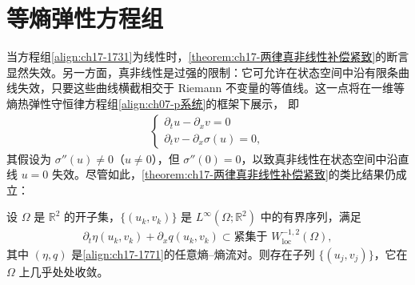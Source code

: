 \documentclass[../../main.tex]{subfiles}
\begin{document}
\section{等熵弹性方程组}\label{section:ch17-等熵弹性}

当方程组\eqref{align:ch17-1731}为线性时，\cref{theorem:ch17-两律真非线性补偿紧致}的断言显然失效。另一方面，真非线性是过强的限制：它可允许在状态空间中沿有限条曲线失效，只要这些曲线横截相交于 Riemann 不变量的等值线。这一点将在一维等熵热弹性守恒律方程组\eqref{align:ch07-p系统}的框架下展示，
即
\begin{align}
\begin{cases}
\partial_t u-\partial_x v=0\\
\partial_t v-\partial_x\sigma(u)=0,
\end{cases}
\label{align:ch17-1771}
\end{align}
其假设为 $\sigma''(u)\neq0$（$u\neq0$），但 $\sigma''(0)=0$，以致真非线性在状态空间中沿直线 $u=0$ 失效。尽管如此，\cref{theorem:ch17-两律真非线性补偿紧致}的类比结果仍成立：

\begin{theorem}[等熵弹性的补偿紧致性]\label{theorem:ch17-弹性补偿紧致}
设 $\Omega$ 是 $\mathbb{R}^2$ 的开子集，$\{(u_k,v_k)\}$ 是 $L^\infty(\Omega;\mathbb{R}^2)$ 中的有界序列，满足
\begin{align}
\partial_t\eta(u_k,v_k)+\partial_x q(u_k,v_k)\subset\text{紧集于 }W^{-1,2}_{\mathrm{loc}}(\Omega),
\label{align:ch17-1772}
\end{align}
其中 $(\eta,q)$ 是\eqref{align:ch17-1771}的任意熵--熵流对。则存在子列 $\{(u_j,v_j)\}$，它在 $\Omega$ 上几乎处处收敛。
\end{theorem}
\end{document}
